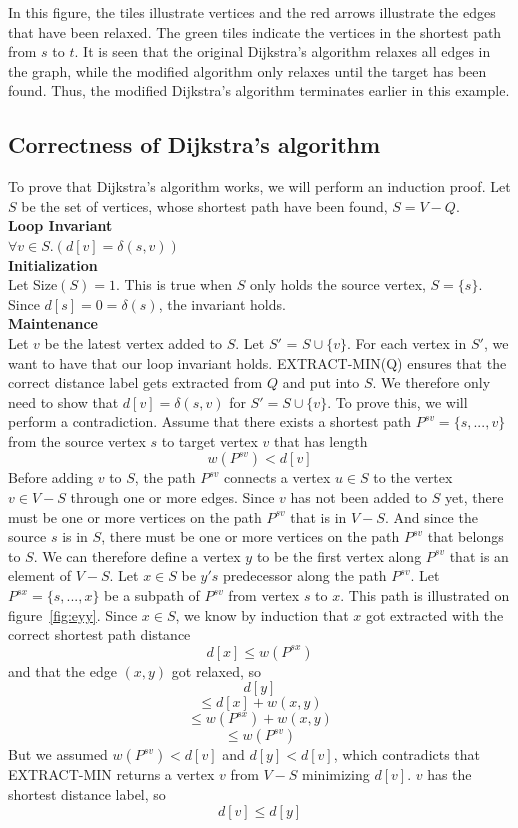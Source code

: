 \documentclass[11pt]{article}
\begin{document}
\noindent In this figure, the tiles illustrate vertices and the red arrows illustrate the edges that have been relaxed. The green tiles indicate the vertices in the shortest path from $s$ to $t$. It is seen that the original Dijkstra's algorithm relaxes all edges in the graph, while the modified algorithm only relaxes until the target has been found. Thus, the modified Dijkstra's algorithm terminates earlier in this example.


\subsection{Correctness of Dijkstra's algorithm}
To prove that Dijkstra's algorithm works, we will perform an induction proof. Let $S$ be the set of vertices, whose shortest path have been found, $S=V-Q$.\\

\noindent \textbf{Loop Invariant}\\
$\forall v\in S.(d[v] = \delta(s,v))$\\

\noindent \textbf{Initialization}\\
Let Size$(S)=1$. This is true when $S$ only holds the source vertex, $S = \{s\}$. Since $d[s]=0=\delta(s)$, the invariant holds.\\

\noindent \textbf{Maintenance}\\
Let $v$ be the latest vertex added to $S$. Let $S'$ = $S \cup \{v\}$. For each vertex in $S'$, we want to have that our loop invariant holds. EXTRACT-MIN(Q) ensures that the correct distance label gets extracted from $Q$ and put into $S$. We therefore only need to show that $d[v]=\delta(s,v)$ for $S'=S \cup \{v\}$. To prove this, we will perform a contradiction. Assume that there exists a shortest path $P^{sv}=\{s, ..., v\}$ from the source vertex $s$ to target vertex $v$ that has length $$w(P^{sv}) < d[v]$$
Before adding $v$ to $S$, the path $P^{sv}$ connects a vertex $u\in S$ to the vertex $v\in V-S$ through one or more edges. Since $v$ has not been added to $S$ yet, there must be one or more vertices on the path $P^{sv}$ that is in $V-S$. And since the source $s$ is in $S$, there must be one or more vertices on the path $P^{sv}$ that belongs to $S$. We can therefore define a vertex $y$ to be the first vertex along $P^{sv}$ that is an element of $V-S$. Let $x\in S$ be $y's$ predecessor along the path $P^{sv}$. Let $P^{sx}=\{s, ..., x\}$ be a subpath of $P^{sv}$ from vertex $s$ to $x$. This path is illustrated on figure~\ref{fig:eyy}. Since $x \in S$, we know by induction that $x$ got extracted with the correct shortest path distance $$d[x] \leq w(P^{sx})$$and that the edge $(x,y)$ got relaxed, so $$d[y]$$$$\leq d[x]+w(x,y)$$$$\leq w(P^{sx}) + w(x,y)$$$$\leq w(P^{sv})$$But we assumed $w(P^{sv}) < d[v]$ and $d[y] < d[v]$, which contradicts that EXTRACT-MIN returns a vertex $v$ from $V-S$ minimizing $d[v]$. $v$ has the shortest distance label, so $$d[v] \leq d[y]$$
\end{document}
